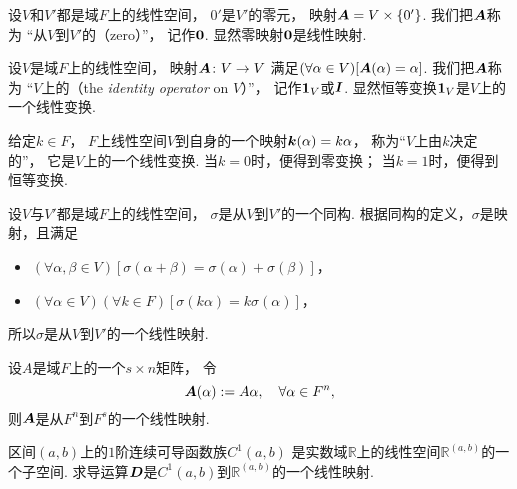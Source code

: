 \begin{example}
设\(V\)和\(V'\)都是域\(F\)上的线性空间，
\(0'\)是\(V'\)的零元，
映射\(\boldsymbol{A}=V\times\{0'\}\).
我们把\(\boldsymbol{A}\)称为
“从\(V\)到\(V'\)的（zero）”，
记作\(\boldsymbol0\).
显然零映射\(\boldsymbol0\)是线性映射.
\end{example}

\begin{example}
设\(V\)是域\(F\)上的线性空间，
映射\(\boldsymbol{A}\colon V\to V\)
满足\((\forall\alpha\in V)[\boldsymbol{A}(\alpha)=\alpha]\).
我们把\(\boldsymbol{A}\)称为
“\(V\)上的（the \emph{identity operator} on \(V\)）”，
记作\(\boldsymbol1_V\)或\(\boldsymbol{I}\).
显然恒等变换\(\boldsymbol1_V\)是\(V\)上的一个线性变换.
\end{example}

\begin{example}
给定\(k\in F\)，
\(F\)上线性空间\(V\)到自身的一个映射\(\boldsymbol{k}(\alpha)=k\alpha\)，
称为“\(V\)上由\(k\)决定的”，
它是\(V\)上的一个线性变换.
当\(k=0\)时，便得到零变换；
当\(k=1\)时，便得到恒等变换.
\end{example}

\begin{example}\label{example.线性映射.同构是线性映射}
设\(V\)与\(V'\)都是域\(F\)上的线性空间，
\(\sigma\)是从\(V\)到\(V'\)的一个同构.
根据同构的定义，\(\sigma\)是映射，且满足\begin{itemize}
	\item \((\forall\alpha,\beta \in V)
	[\sigma(\alpha+\beta)=\sigma(\alpha)+\sigma(\beta)]\)，
	\item \((\forall\alpha \in V)
	(\forall k \in F)
	[\sigma(k\alpha)=k\sigma(\alpha)]\)，
\end{itemize}
所以\(\sigma\)是从\(V\)到\(V'\)的一个线性映射.
\end{example}

\begin{example}\label{example:线性映射.左乘矩阵是线性映射}
设\(A\)是域\(F\)上的一个\(s \times n\)矩阵，
令\begin{equation*}
	\boldsymbol{A}(\alpha)
	:= A\alpha,
	\quad \forall \alpha \in F^n,
\end{equation*}
则\(\boldsymbol{A}\)是从\(F^n\)到\(F^s\)的一个线性映射.
\end{example}

\begin{example}
区间\((a,b)\)上的\(1\)阶连续可导函数族\(C^1(a,b)\)
是实数域\(\mathbb{R}\)上的线性空间\(\mathbb{R}^{(a,b)}\)的一个子空间.
求导运算\(\boldsymbol{D}\)是\(C^1(a,b)\)到\(\mathbb{R}^{(a,b)}\)的一个线性映射.
\end{example}

